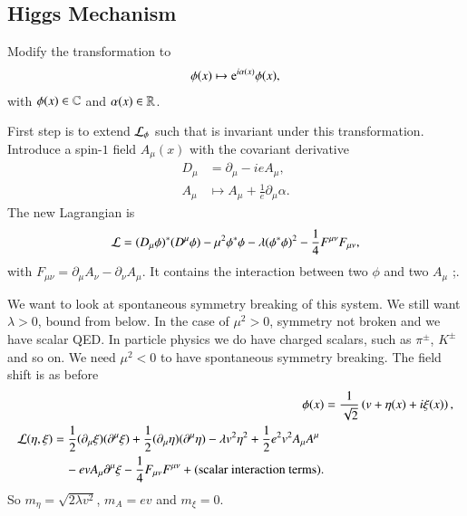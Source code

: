 \subsection{Higgs Mechanism}
Modify the transformation to
   \begin{align*}
   \phi(x) \mapsto \mathrm{e}^{i\alpha(x)} \phi(x),
\end{align*}
with $\phi(x) \in \mathbb{C}$ and $\alpha(x) \in \mathbb{R}$.

First step is to extend $\mathcal{L}_\phi$ such that is invariant under this transformation. Introduce a spin-$1$ field $A_\mu(x)$ with the covariant derivative
\begin{align*}
   D_\mu &= \partial_\mu - ieA_\mu, \\
   A_\mu &\mapsto A_\mu + \frac{1}{e} \partial_\mu \alpha.
\end{align*}
The new Lagrangian is 
\begin{align}
   \mathcal{L} = (D_\mu \phi)^* (D^\mu \phi) - \mu^2 \phi^* \phi - \lambda (\phi^* \phi)^2 - \frac{1}{4} F^{\mu\nu}F_{\mu\nu},
\end{align}
with $F_{\mu\nu}=\partial_\mu A_\nu - \partial_\nu A_\mu$. It contains the interaction between two $\phi$ and two $A_\mu$ ;.


We want to look at spontaneous symmetry breaking of this system. We still want $\lambda > 0$, bound from below. In the case of $\mu^2 > 0$, symmetry not broken and we have scalar QED. In particle physics we do have charged scalars, such as $\pi^{\pm}$, $K^{\pm}$ and so on. We need $\mu^2 < 0$ to have spontaneous symmetry breaking. The field shift is as before
\begin{align}
   \phi(x) &= \frac{1}{\sqrt{2}} \left( v + \eta (x) + i \xi (x) \right), \\
   \begin{split}
   \mathcal{L}(\eta, \xi) &= \frac{1}{2} (\partial_\mu \xi) (\partial^\mu \xi) + \frac{1}{2} (\partial_\mu \eta) (\partial^\mu \eta) - \lambda v^2 \eta^2 + \frac{1}{2} e^2 v^2 A_\mu A^\mu \\ 
                   &\quad - ev A_\mu \partial^\mu \xi - \frac{1}{4}F_{\mu\nu}F^{\mu\nu}  + (\text{scalar interaction terms}).
   \end{split}
\end{align}
So $m_\eta = \sqrt{2\lambda v^2}$, $m_A = ev$ and $m_\xi = 0$.


